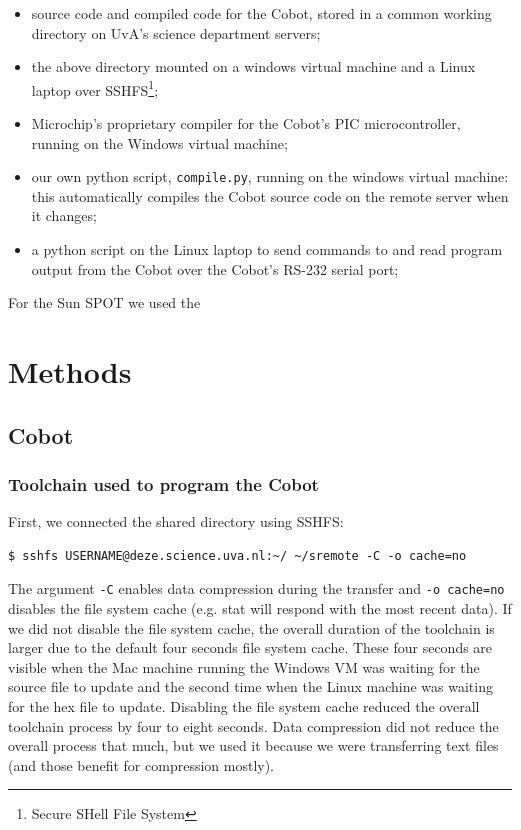 \documentclass[a4paper,10pt]{article} %
\begin{document}
\begin{itemize}
    \item source code and compiled code for the Cobot, stored in a common
    working directory on UvA's science department servers;
    \item  the above directory mounted on a windows virtual machine and a Linux
    laptop over SSHFS\footnote{Secure SHell File System};
    \item Microchip's proprietary compiler for the Cobot's PIC microcontroller,
    running on the Windows virtual machine;
    \item our own python script, \texttt{compile.py}, running on the windows
    virtual machine: this automatically compiles the Cobot source code on the
    remote server when it changes;
    \item a python script on the Linux laptop to send commands to and read program
    output from the Cobot over the Cobot's RS-232 serial port;
\end{itemize}

For the Sun SPOT we used the %




\section{Methods} %

\subsection{Cobot} %



\subsubsection{Toolchain used to program the Cobot} %
\label{ssub:Toolchain used to program the Cobot}

First, we connected the shared directory using SSHFS:
\begin{verbatim}
$ sshfs USERNAME@deze.science.uva.nl:~/ ~/sremote -C -o cache=no
\end{verbatim}

The argument \texttt{-C} enables data compression during the transfer and
\texttt{-o cache=no} disables the file system cache (e.g. stat will respond with
the most recent data). If we did not disable the file system cache, the overall
duration of the toolchain is larger due to the default four seconds file system
cache. These four seconds are visible when the Mac machine running the Windows
VM was waiting for the source file to update and the second time when the Linux
machine was waiting for the hex file to update. Disabling the file system cache
reduced the overall toolchain process by four to eight seconds. Data compression
did not reduce the overall process that much, but we used it because we were
transferring text files (and those benefit for compression mostly).
\end{document}
